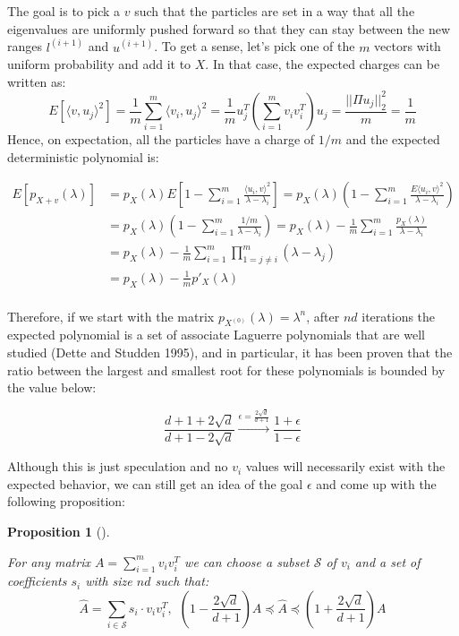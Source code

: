 \documentclass[
  letterpaper,
  DIV=11,
  numbers=noendperiod]{scrartcl}
\theoremstyle{plain}
\theoremstyle{plain}
\newtheorem{proposition}{Proposition}[section]
\theoremstyle{plain}
\theoremstyle{definition}
\theoremstyle{plain}
\theoremstyle{remark}
\begin{document}
The goal is to pick a \(v\) such that the particles are set in a way
that all the eigenvalues are uniformly pushed forward so that they can
stay between the new ranges \(l^{(i+1)}\) and \(u^{(i+1)}\). To get a
sense, let's pick one of the \(m\) vectors with uniform probability and
add it to \(X\). In that case, the expected charges can be written as:
\[E[\langle v, u_j \rangle^2] = \frac{1}{m} \sum_{i=1}^m \langle v_i, u_j \rangle^2 = \frac{1}{m} u_j^T \left( \sum_{i=1}^m v_i v_i^T \right)u_j = \frac{||\Pi u_j||_2^2}{m} = \frac{1}{m}\]
Hence, on expectation, all the particles have a charge of \(1/m\) and
the expected deterministic polynomial is:

\begin{align*}
E[p_{X + v}(\lambda)] &= p_X(\lambda) E\left[1 - \sum_{i=1}^m \frac{\langle u_i, v\rangle^2}{\lambda - \lambda_i}\right] = p_X(\lambda) \left(1 - \sum_{i=1}^m \frac{E\langle u_i, v\rangle^2}{\lambda - \lambda_i}\right)\\
& = p_X(\lambda) \left(1 - \sum_{i=1}^m \frac{1/m}{\lambda - \lambda_i}\right) = p_X(\lambda) - \frac{1}{m} \sum_{i=1}^m \frac{p_X(\lambda)}{\lambda - \lambda_i}\\
& = p_X(\lambda) - \frac{1}{m} \sum_{i=1}^m \prod_{1 = j\neq i}^m (\lambda - \lambda_j)\\
&= p_X(\lambda) - \frac{1}{m} p'_X(\lambda)\\
\end{align*}

Therefore, if we start with the matrix
\(p_{X^{(0)}}(\lambda) = \lambda^n\), after \(nd\) iterations the
expected polynomial is a set of associate Laguerre polynomials that are
well studied (Dette and Studden 1995), and in particular, it has been
proven that the ratio between the largest and smallest root for these
polynomials is bounded by the value below:

\[\frac{d + 1 + 2\sqrt{d}}{d + 1 - 2\sqrt{d}} \xrightarrow{\epsilon = \frac{2\sqrt{d}}{d+1}} \frac{1 + \epsilon
}{1 - \epsilon}\]

Although this is just speculation and no \(v_i\) values will necessarily
exist with the expected behavior, we can still get an idea of the goal
\(\epsilon\) and come up with the following proposition:

\leavevmode{}%
\begin{proposition}[]\label{prp-final-form}

For any matrix \(A = \sum_{i=1}^m v_i v_i^T\) we can choose a subset
\(\mathcal{S}\) of \(v_i\) and a set of coefficients \(s_i\) with size
\(nd\) such that:
\[\hat{A} = \sum_{i \in \mathcal{S}} s_i \cdot v_i v_i^T,~~ (1 - \frac{2\sqrt{d}}{d+1}) A \preceq \hat{A} \preceq (1 + \frac{2\sqrt{d}}{d+1}) A\]

\end{proposition}
\end{document}
